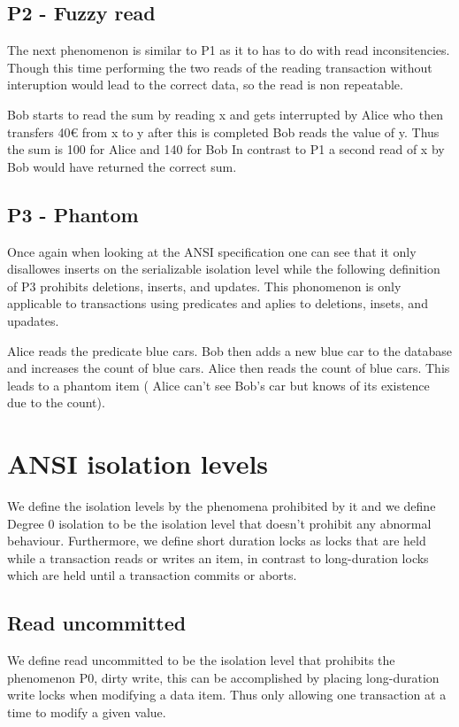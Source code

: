 \documentclass[sigconf, review=true]{acmart}
\begin{document}
\subsection{P2 - Fuzzy read}
The next phenomenon is similar to P1 as it to has to do with read inconsitencies.
Though this time performing the two reads of the reading transaction without interuption would lead
to the correct data, so the read is non repeatable.
\begin{example}
    Bob starts to read the sum by reading x and gets interrupted by Alice who then transfers 40€ from x to y after this is completed Bob reads the value of y.
    Thus the sum is 100 for Alice and 140 for Bob
    In contrast to P1 a second read of x by Bob would have returned the correct sum.
\end{example}
\subsection{P3 - Phantom}
Once again when looking at the ANSI specification one can see that it only disallowes inserts on the serializable
isolation level while the following definition of P3 prohibits deletions, inserts, and updates.
This phonomenon is only applicable to transactions using predicates and aplies to deletions, insets, and upadates.
\begin{example}
    Alice reads the predicate blue cars. Bob then adds a new blue car to the database and increases
    the count of blue cars. Alice then reads the count of blue cars. This leads to a phantom item
    ( Alice can’t see Bob's car but knows of its existence due to the count).
\end{example}

\section{ANSI isolation levels}
We define the isolation levels by the phenomena prohibited by it and we define
Degree 0 isolation to be the isolation level that doesn’t prohibit any abnormal
behaviour. Furthermore, we define short duration locks as locks that are held
while a transaction reads or writes an item, in contrast to long-duration locks which are
held until a transaction commits or aborts.

\subsection{Read uncommitted}
We define read uncommitted to be the isolation level that prohibits the phenomenon
P0, dirty write, this can be accomplished by placing long-duration write locks when modifying a data item.
Thus only allowing one transaction at a time to modify a given value.
\end{document}

